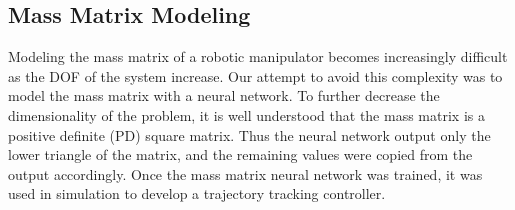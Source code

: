 \subsection*{Mass Matrix Modeling}
Modeling the mass matrix of a robotic manipulator becomes increasingly difficult as the DOF of the system increase.
Our attempt to avoid this complexity was to model the mass matrix with a neural network.
To further decrease the dimensionality of the problem, it is well understood that the mass matrix is a positive definite (PD) square matrix.
Thus the neural network output only the lower triangle of the matrix, and the remaining values were copied from the output accordingly.
Once the mass matrix neural network was trained, it was used in simulation to develop a trajectory tracking controller.
